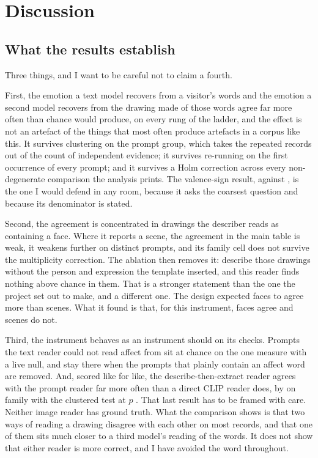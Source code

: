 \chapter{Discussion}
\label{ch:discussion}

\section{What the results establish}
\label{sec:disc-establish}

Three things, and I want to be careful not to claim a fourth.

First, the emotion a text model recovers from a visitor's words and the emotion a second model recovers from the drawing made of those words agree far more often than chance would produce, on every rung of the ladder, and the effect is not an artefact of the things that most often produce artefacts in a corpus like this. It survives clustering on the prompt group, which takes the \nRepeats{} repeated records out of the count of independent evidence; it survives re-running on the first occurrence of every prompt; and it survives a Holm correction across every non-degenerate comparison the analysis prints. The valence-sign result, \FullEmoSignObs{} against \FullEmoSignNull{}, is the one I would defend in any room, because it asks the coarsest question and because its denominator is stated.

Second, the agreement is concentrated in drawings the describer reads as containing a face. Where it reports a scene, the agreement in the main table is weak, it weakens further on distinct prompts, and its family cell does not survive the multiplicity correction. The ablation then removes it: describe those drawings without the person and expression the template inserted, and this reader finds nothing above chance in them. That is a stronger statement than the one the project set out to make, and a different one. The design expected faces to agree more than scenes. What it found is that, for this instrument, faces agree and scenes do not.

Third, the instrument behaves as an instrument should on its checks. Prompts the text reader could not read affect from sit at chance on the one measure with a live null, and stay there when the prompts that plainly contain an affect word are removed. And, scored like for like, the describe-then-extract reader agrees with the prompt reader far more often than a direct CLIP reader does, by \McDiffFamPp{} on family with the clustered test at $p$ \McClusterFamP{}. That last result has to be framed with care. Neither image reader has ground truth. What the comparison shows is that two ways of reading a drawing disagree with each other on most records, and that one of them sits much closer to a third model's reading of the words. It does not show that either reader is more correct, and I have avoided the word throughout.

